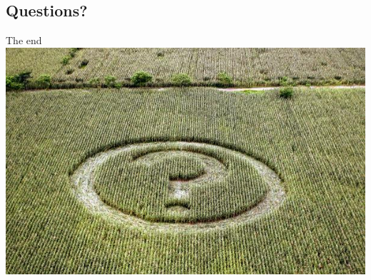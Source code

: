 \documentclass[screen, compress]{beamer}
\begin{document}
\subsection{Questions?}
\begin{frame}{The end}
\includegraphics[width=\textwidth]{img/any-questions}
\end{frame}
\end{document}

